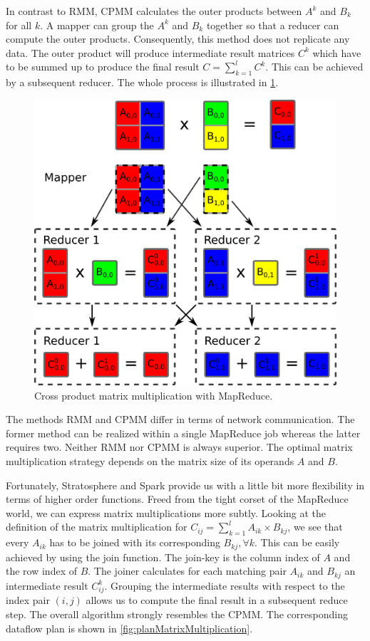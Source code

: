 In contrast to RMM, CPMM calculates the outer products between $A^k$ and $B_k$ for all $k$.
A mapper can group the $A^k$ and $B_k$ together so that a reducer can compute the outer products.
Consequently, this method does not replicate any data.
The outer product will produce intermediate result matrices $C^k$ which have to be summed up to produce the final result $C=\sum_{k=1}^{l} C^k$.
This can be achieved by a subsequent reducer.
The whole process is illustrated in \cref{fig:CPMM}.

\begin{figure}[!h]
	\centering
	\includegraphics[width=0.4\linewidth]{images/cpmm.png}
	\caption{Cross product matrix multiplication with MapReduce.}
	\label{fig:CPMM}
\end{figure}

The methods RMM and CPMM differ in terms of network communication.
The former method can be realized within a single MapReduce job whereas the latter requires two.
Neither RMM nor CPMM is always superior.
The optimal matrix multiplication strategy depends on the matrix size of its operands $A$ and $B$.

Fortunately, Stratosphere and Spark provide us with a little bit more flexibility in terms of higher order functions.
Freed from the tight corset of the MapReduce world, we can express matrix multiplications more subtly.
Looking at the definition of the matrix multiplication for $C_{ij}=\sum_{k=1}^{l}A_{ik}\times B_{kj}$, we see that every $A_{ik}$ has to be joined with its corresponding $B_{kj},\forall k$.
This can be easily achieved by using the join function.
The join-key is the column index of $A$ and the row index of $B$.
The joiner calculates for each matching pair $A_{ik}$ and $B_{kj}$ an intermediate result $C_{ij}^k$.
Grouping the intermediate results with respect to the index pair $(i,j)$ allows us to compute the final result in a subsequent reduce step.
The overall algorithm strongly resembles the CPMM.
The corresponding dataflow plan is shown in \cref{fig:planMatrixMultiplication}.

